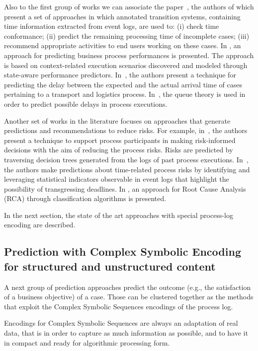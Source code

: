 Also to the first group of works we can associate the paper~\cite{DBLP:journals/is/AalstSS11}, the authors of which present a set of approaches in which annotated transition systems, containing time information extracted from event logs, are used to: (i) check time conformance;
(ii) predict the remaining processing time of incomplete cases; (iii) recommend appropriate activities to end users working on these cases. In \cite{Folino}, an approach for predicting business process performances is presented. The approach is based on context-related execution scenarios discovered and modeled through state-aware performance predictors. In~\cite{Metzgeretal12}, the authors present a technique for predicting the delay between the expected and the actual arrival time of cases pertaining to a transport and logistics process. In~\cite{Senderovichetal15}, the queue theory is used in order to predict possible delays in process executions.

Another set of works in the literature focuses on approaches that generate predictions and recommendations to reduce risks. For example, in~\cite{DBLP:conf/caise/ConfortiLRA13}, the authors present a technique to support process participants in making risk-informed decisions with the aim of reducing the process risks. Risks are predicted by traversing decision trees generated from the logs of past process executions. In~\cite{Pika}, the authors make predictions about time-related process risks by identifying and leveraging statistical indicators observable in event logs  that highlight the possibility of transgressing deadlines.
In \cite{suriadi}, an approach for Root Cause Analysis (RCA) through classification algorithms is presented.

In the next section, the state of the art approaches with special process-log encoding are described.



\subsection{Prediction with Complex Symbolic Encoding for structured and unstructured content}

A next group of prediction approaches predict the outcome (e.g., the satisfaction of a business objective) of a case. Those can be clustered together as the methods that exploit the Complex Symbolic Sequences encodings of the process log.

Encodings for Complex Symbolic Sequences are always an adaptation of real data, that is in order to capture as much information as possible, and to have it in compact and ready for algorithmic processing form. 

